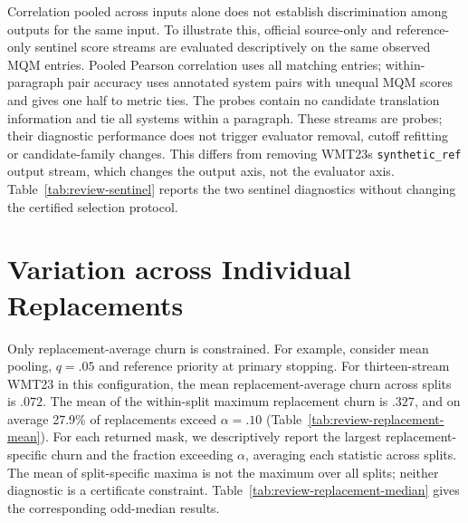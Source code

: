 Correlation pooled across inputs alone does not establish discrimination among outputs for the same input. To illustrate this, official source-only and reference-only sentinel score streams \citep{perrella2024sentinel} are evaluated descriptively on the same observed MQM entries. Pooled Pearson correlation uses all matching entries; within-paragraph pair accuracy uses annotated system pairs with unequal MQM scores and gives one half to metric ties. The probes contain no candidate translation information and tie all systems within a paragraph. These streams are probes; their diagnostic performance does not trigger evaluator removal, cutoff refitting or candidate-family changes. This differs from removing WMT23\textquotesingle s \texttt{synthetic\_ref} output stream, which changes the output axis, not the evaluator axis.
Table~\ref{tab:review-sentinel} reports the two sentinel diagnostics without changing the certified selection protocol.


\section{Variation across Individual Replacements}
\label{app:individual-replacements}


Only replacement-average churn is constrained. For example, consider mean pooling, $q=.05$ and reference priority at primary stopping. For thirteen-stream WMT23 in this configuration, the mean replacement-average churn across splits is $.072$. The mean of the within-split maximum replacement churn is $.327$, and on average 27.9\% of replacements exceed $\alpha=.10$ (Table~\ref{tab:review-replacement-mean}). For each returned mask, we descriptively report the largest replacement-specific churn and the fraction exceeding $\alpha$, averaging each statistic across splits. The mean of split-specific maxima is not the maximum over all splits; neither diagnostic is a certificate constraint.
Table~\ref{tab:review-replacement-median} gives the corresponding odd-median results.
